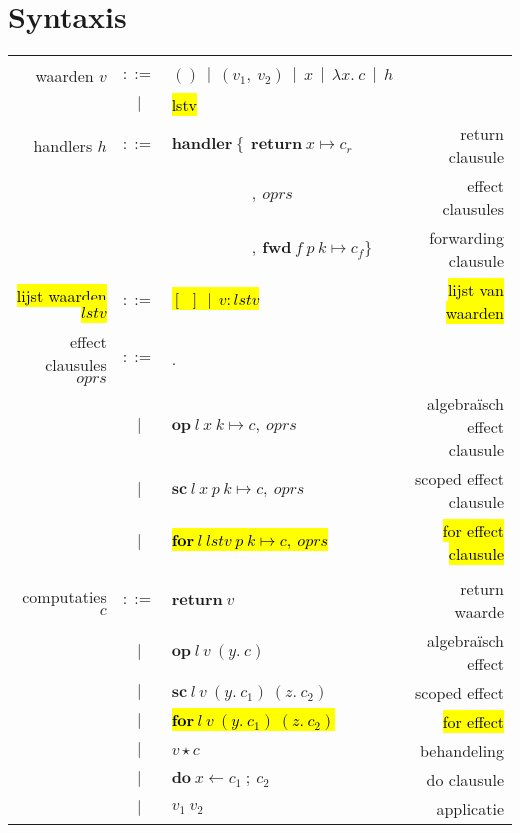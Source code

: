 \chapter{Syntaxis}
\label{hoofdstuk:syntaxis}
\begin{table}
    \centering
    \begin{tabular}{|r c l r|}
    \hline 
    & & & \\
         waarden $v$ & $::=$ & $() \: \: | \: \: (v_{1}, \: v_{2} ) \: \: | \: \: x \: \: | \: \: \lambda x . \: c \: \: | \: \: h$ & \\
         & $|$ & \hl{lstv} & \\
         handlers $h$ & $::=$ & $\textbf{handler} \: \{ \: \: \textbf{return} \: x \mapsto c_{r}$ & return clausule\\
         & & $\qquad \qquad \quad , \: oprs$ & effect  clausules \\
         & & $\qquad \qquad \quad , \: \textbf{fwd} \: f \: p \: k \mapsto c_{f} \}$ & forwarding clausule \\
         \hl{lijst waarden $lstv$} & $::=$ & \hl{$[\:\:]\:\:|\:\:v:lstv$} & \hl{lijst van waarden}\\
          effect clausules $oprs$ & $::=$ & . & \\ 
          & $|$ & $\textbf{op} \: l \: x \: k \mapsto c, \: oprs$ & algebraïsch effect clausule\\
           & $|$ & $\textbf{sc} \: l \: x \: p \: k \mapsto c, \: oprs$ & scoped effect clausule\\
        & $|$ & \hl{$\textbf{for}\:l\:lstv\:p\:k \mapsto c, \  oprs$} & \hl{for effect clausule} \\
        & & & \\
         computaties $c$ & $::=$ & $\textbf{return} \: v$ & return waarde \\
          & $|$ & $\textbf{op} \: l \: v \: (y. \: c)$ & algebraïsch effect \\
          & $|$ & $\textbf{sc} \: l \: v \: (y. \: c_{1}) \: (z. \: c_{2})$ & scoped effect \\
          & $|$ & \hl{$\textbf{for} \  l \: v \: (y. \: c_{1}) \: (z. \: c_{2})$} & \hl{for effect} \\
          & $|$ & $v \star c$ & behandeling \\
          & $|$ & $\textbf{do} \: x \leftarrow c_{1}\:; \: c_{2}$ & do clausule \\
          & $|$ & $v_{1} \: v_{2}$ & applicatie \\

\end{tabular}
\end{table}

